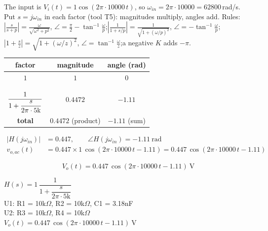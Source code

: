 \documentclass[11pt]{article}
\begin{document}
The input is $V_i(t) = 1\cos\left(2\pi\cdot 10000\,t\right)$, so $\omega_{in} = 2\pi\cdot 10000 = 62800$\,rad/s. Put $s=j\omega_{in}$ in each factor (tool T5): magnitudes multiply, angles add.
{\small Rules: $\left|\frac{s}{s+p}\right| = \frac{\omega}{\sqrt{\omega^2+p^2}}$, $\angle = \frac{\pi}{2}-\tan^{-1}\frac{\omega}{p}$;\quad $\left|\frac{1}{1+s/p}\right| = \frac{1}{\sqrt{1+(\omega/p)^2}}$, $\angle = -\tan^{-1}\frac{\omega}{p}$;\quad $\left|1+\frac{s}{z}\right| = \sqrt{1+(\omega/z)^2}$, $\angle = \tan^{-1}\frac{\omega}{z}$;\quad a negative $K$ adds $-\pi$.}
\begin{center}\renewcommand{\arraystretch}{1.35}
\begin{tabular}{ccc}
\toprule
factor & magnitude & angle (rad) \\
\midrule
$1$ & $1$ & $0$ \\
$\rule[-1.7em]{0pt}{4em}\dfrac{1}{1+\dfrac{s}{2\pi\cdot 5\mathrm{k}}}$ & $0.4472$ & $-1.11$ \\
\textbf{total} & $\mathbf{0.4472}$ (product) & $\mathbf{-1.11}$ (sum) \\
\bottomrule
\end{tabular}\end{center}

\begin{align*}
|H(j\omega_{in})| &= 0.447, \qquad \angle H(j\omega_{in}) = -1.11\ \mathrm{rad} \\
v_{o,ac}(t) &= 0.447\times 1\,\cos\left(2\pi\cdot 10000\,t - 1.11\right) = 0.447\,\cos\left(2\pi\cdot 10000\,t - 1.11\right)
\end{align*}

\[
\boxed{V_o(t) = 0.447\,\cos\left(2\pi\cdot 10000\,t - 1.11\right)\ \mathrm{V}}
\]

\begin{ansbox}
$H(s) = 1\,\dfrac{1}{1+\dfrac{s}{2\pi\cdot 5\mathrm{k}}}$\\[4pt]
U1: R1 = 10k$\Omega$, R2 = 10k$\Omega$, C1 = 3.18nF\\
U2: R3 = 10k$\Omega$, R4 = 10k$\Omega$\\[4pt]
$V_o(t) = 0.447\,\cos\left(2\pi\cdot 10000\,t - 1.11\right)\ \mathrm{V}$
\end{ansbox}

\newpage
\end{document}
